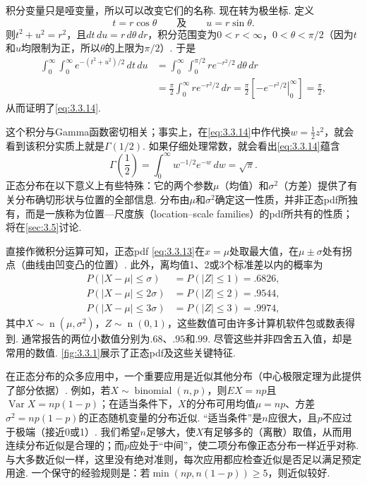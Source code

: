 积分变量只是哑变量，所以可以改变它们的名称. 现在转为极坐标. 定义
$$t=r\cos\theta\qquad\text{及}\qquad u=r\sin\theta.$$
则$t^2+u^2=r^2$，且$dt\,du=r\,d\theta\,dr$，积分范围变为$0<r<\infty$，$0<\theta<\pi/2$（因为$t$和$u$均限制为正，所以$\theta$的上限为$\pi/2$）. 于是
\begin{align*}
\int_0^\infty\int_0^\infty e^{-(t^2+u^2)/2}\,dt\,du
&=\int_0^\infty\int_0^{\pi/2}re^{-r^2/2}\,d\theta\,dr\\
&=\frac\pi2\int_0^\infty re^{-r^2/2}\,dr
=\frac\pi2\left[\left.-e^{-r^2/2}\right|_0^\infty\right]=\frac\pi2,
\end{align*}
从而证明了\eqref{eq:3.3.14}.

这个积分与Gamma函数密切相关；事实上，在\eqref{eq:3.3.14}中作代换$w=\frac12z^2$，就会看到该积分实质上就是$\Gamma(1/2)$. 如果仔细处理常数，就会看出\eqref{eq:3.3.14}蕴含
\begin{equation}\label{eq:3.3.15}
\Gamma\left(\frac12\right)=\int_0^\infty w^{-1/2}e^{-w}\,dw=\sqrt\pi.
\end{equation}
正态分布在以下意义上有些特殊：它的两个参数$\mu$（均值）和$\sigma^2$（方差）提供了有关分布确切形状与位置的全部信息. 分布由$\mu$和$\sigma^2$确定这一性质，并非正态pdf所独有，而是一族称为位置—尺度族（location--scale families）的pdf所共有的性质；将在\autoref{sec:3.5}讨论.

直接作微积分运算可知，正态pdf \eqref{eq:3.3.13}在$x=\mu$处取最大值，在$\mu\pm\sigma$处有拐点（曲线由凹变凸的位置）. 此外，离均值1、2或3个标准差以内的概率为
\begin{align*}
P(|X-\mu|\le\sigma)&=P(|Z|\le1)=.6826,\\
P(|X-\mu|\le2\sigma)&=P(|Z|\le2)=.9544,\\
P(|X-\mu|\le3\sigma)&=P(|Z|\le3)=.9974,
\end{align*}
其中$X\sim\operatorname n(\mu,\sigma^2)$，$Z\sim\operatorname n(0,1)$，这些数值可由许多计算机软件包或数表得到. 通常报告的两位小数值分别为$.68$、$.95$和$.99$. 尽管这些并非四舍五入值，却是常用的数值. \autoref{fig:3.3.1}展示了正态pdf及这些关键特征.

在正态分布的众多应用中，一个重要应用是近似其他分布（中心极限定理为此提供了部分依据）. 例如，若$X\sim\operatorname{binomial}(n,p)$，则$EX=np$且$\operatorname{Var}X=np(1-p)$；在适当条件下，$X$的分布可用均值$\mu=np$、方差$\sigma^2=np(1-p)$的正态随机变量的分布近似. “适当条件”是$n$应很大，且$p$不应过于极端（接近0或1）. 我们希望$n$足够大，使$X$有足够多的（离散）取值，从而用连续分布近似是合理的；而$p$应处于“中间”，使二项分布像正态分布一样近乎对称. 与大多数近似一样，这里没有绝对准则，每次应用都应检查近似是否足以满足预定用途. 一个保守的经验规则是：若$\min(np,n(1-p))\ge5$，则近似较好.

